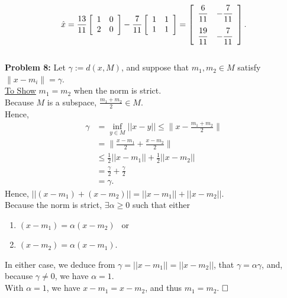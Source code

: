 \documentclass[letterpaper]{article}
\begin{document}
$$\hat{x} = \frac{13}{11} \left[\begin{array}{cc} 1 & 0 \\ 2 & 0 \end{array}\right] - \frac{7}{11} \left[\begin{array}{cc} 1 & 1 \\ 1 & 1 \end{array}\right] = \left[\begin{array}{cc} \strut\dfrac{6}{11} & -\strut\dfrac{7}{11} \\[2.5ex] \strut\dfrac{19}{11} & -\strut\dfrac{7}{11} \end{array}\right].$$
\medskip\\
\noindent \textbf{Problem  8:}
Let $\gamma := d(x, M)$, and suppose that $m_1, m_2 \in M$ satisfy $\|x - m_i \| = \gamma$.
\smallskip \\
\underline{To Show} $m_1 = m_2$ when the norm is strict.\smallskip \\
Because $M$ is a subspace, $\frac{m_1 + m_2}{2} \in M$.
\smallskip \\
Hence,
$$\begin{aligned} \gamma &= \inf_{y\in M} ||x-y|| \leq \bigg\|x-\frac{m_1 + m_2}{2}\bigg\| \\
&= \bigg\|\frac{x-m_1}{2}+\frac{x-m_2}{2}\bigg\| \\
&\leq \frac{1}{2}||x-m_1|| + \frac{1}{2}||x-m_2|| \\
& = \frac{\gamma}{2} + \frac{\gamma}{2} \\
& = \gamma. \end{aligned}$$
Hence, $||(x-m_1)+(x-m_2)|| = ||x-m_1|| + ||x-m_2||.$
\smallskip \\
Because the norm is strict, $\exists \alpha \geq 0$ such that either
\begin{enumerate}
\setlength{\itemsep}{.1in}
\renewcommand{\labelenumi}{(\roman{enumi})}
\item $(x-m_1) = \alpha (x-m_2)~~$ or

\item $(x-m_2) = \alpha (x-m_1).$
\end{enumerate}
In either case, we deduce from $\gamma = ||x-m_1|| = ||x-m_2||$, that $\gamma = \alpha \gamma$, and, because $\gamma \neq 0$, we have $\alpha = 1$.
\smallskip \\
With $\alpha = 1$, we have $x-m_1 = x-m_2$, and thus $m_1 = m_2$. $\hfill \square$
\medskip \\
\end{document}
